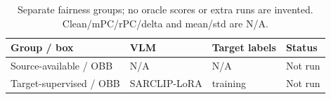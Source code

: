 \begin{table}[t]
\centering
\setlength{\tabcolsep}{5pt}
\renewcommand{\arraystretch}{1.15}
\caption{Separate fairness groups; no oracle scores or extra runs are invented. Clean/mPC/rPC/delta and mean/std are N/A.}\label{tab:oracle}
\begin{tabular}{@{}llll@{}}\toprule
Group / box & VLM & Target labels & Status \\
\midrule
Source-available / OBB & N/A & N/A & Not run \\
Target-supervised / OBB & SARCLIP-LoRA & training & Not run \\
\bottomrule\end{tabular}
\end{table}
